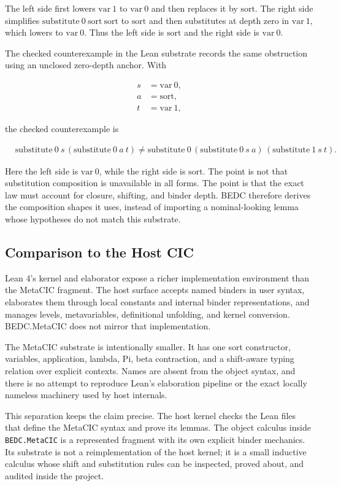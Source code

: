 The left side first lowers $\mathrm{var}\ 1$ to $\mathrm{var}\ 0$ and then
replaces it by $\mathrm{sort}$. The right side simplifies
$\mathrm{substitute}\ 0\ \mathrm{sort}\ \mathrm{sort}$ to $\mathrm{sort}$ and
then substitutes at depth zero in $\mathrm{var}\ 1$, which lowers to
$\mathrm{var}\ 0$. Thus the left side is $\mathrm{sort}$ and the right side is
$\mathrm{var}\ 0$.

The checked counterexample in the Lean substrate records the same obstruction
using an unclosed zero-depth anchor. With

$$
\begin{aligned}
s &= \mathrm{var}\ 0,\\
a &= \mathrm{sort},\\
t &= \mathrm{var}\ 1,
\end{aligned}
$$

the checked counterexample is

$$
\begin{aligned}
&\mathrm{substitute}\ 0\ s\,
    (\mathrm{substitute}\ 0\ a\ t)
\neq
\mathrm{substitute}\ 0\,
    (\mathrm{substitute}\ 0\ s\ a)\,
    (\mathrm{substitute}\ 1\ s\ t).
\end{aligned}
$$


Here the left side is $\mathrm{var}\ 0$, while the right side is
$\mathrm{sort}$. The point is not that substitution composition is unavailable
in all forms. The point is that the exact law must account for closure,
shifting, and binder depth. BEDC therefore derives the composition shapes it
uses, instead of importing a nominal-looking lemma whose hypotheses do not
match this substrate.

\subsection{Comparison to the Host CIC}
\label{subsec:substrate-host-cic-comparison}

Lean 4's kernel and elaborator expose a richer implementation environment than
the MetaCIC fragment. The host surface accepts named binders in user syntax,
elaborates them through local constants and internal binder representations,
and manages levels, metavariables, definitional unfolding, and kernel
conversion. BEDC.MetaCIC does not mirror that implementation.

The MetaCIC substrate is intentionally smaller. It has one sort constructor,
variables, application, lambda, Pi, beta contraction, and a shift-aware typing
relation over explicit contexts. Names are absent from the object syntax, and
there is no attempt to reproduce Lean's elaboration pipeline or the exact
locally nameless machinery used by host internals.

This separation keeps the claim precise. The host kernel checks the Lean files
that define the MetaCIC syntax and prove its lemmas. The object calculus inside
\texttt{BEDC.MetaCIC} is a represented fragment with its own explicit binder
mechanics. Its substrate is not a reimplementation of the host kernel; it is a
small inductive calculus whose shift and substitution rules can be inspected,
proved about, and audited inside the project.
